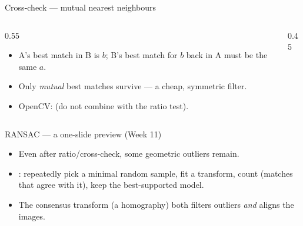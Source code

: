 \documentclass[10pt,aspectratio=169]{beamer}
\begin{document}
\begin{frame}{Cross-check — mutual nearest neighbours}
  \begin{columns}[T]
    \begin{column}{0.55\textwidth}
      \begin{itemize}
        \item A's best match in B is $b$; B's best match for $b$ back in A must be the same $a$.
        \item Only \emph{mutual} best matches survive — a cheap, symmetric filter.
        \item OpenCV:  (do not combine with the ratio test).
      \end{itemize}
    \end{column}
    \begin{column}{0.45\textwidth}
      \begin{center}
      \end{center}
    \end{column}
  \end{columns}
\end{frame}

\begin{frame}{RANSAC — a one-slide preview (Week 11)}
  \begin{itemize}
    \item Even after ratio/cross-check, some geometric outliers remain.
    \item {}: repeatedly pick a minimal random sample, fit a transform, count 
          (matches that agree with it), keep the best-supported model.
    \item The consensus transform (a homography) both filters outliers \emph{and} aligns the images.
  \end{itemize}
\end{frame}
\end{document}
